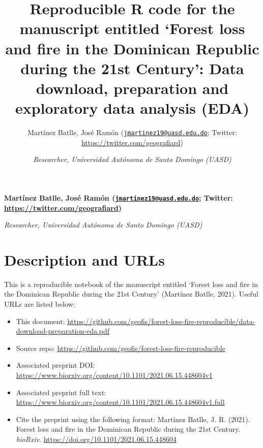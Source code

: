 \documentclass[10pt,landscape,a3paper]{article}
\title{Reproducible R code for the manuscript entitled `Forest loss and
fire in the Dominican Republic during the 21st Century': Data download,
preparation and exploratory data analysis (EDA)  }
\author{\Large Martínez Batlle, José Ramón
(\href{mailto:jmartinez19@uasd.edu.do}{\nolinkurl{jmartinez19@uasd.edu.do}};
Twitter:
\url{https://twitter.com/geografiard})\vspace{0.05in} \newline\normalsize\emph{}   \and \Large \vspace{0.05in} \newline\normalsize\emph{Researcher,
Universidad Autónoma de Santo Domingo (UASD)}  }
\date{}
\newcommand*{\authorfont}{\fontfamily{phv}\selectfont}
\begin{document}
	
%    


{%
\setlength{\parindent}{0pt}
\thispagestyle{plain}
{\fontsize{18}{20}\selectfont\raggedright 
\maketitle  %

}

{
   \vskip 13.5pt\relax \normalsize\fontsize{11}{12} 
\textbf{\authorfont Martínez Batlle, José Ramón
(\href{mailto:jmartinez19@uasd.edu.do}{\nolinkurl{jmartinez19@uasd.edu.do}};
Twitter:
\url{https://twitter.com/geografiard})} \hskip 15pt \emph{\small }   \par \textbf{\authorfont } \hskip 15pt \emph{\small Researcher,
Universidad Autónoma de Santo Domingo (UASD)}   

}

}






\vskip 6.5pt

{
\hypersetup{linkcolor=black}
\setcounter{tocdepth}{4}
\tableofcontents
}

\noindent  \hypertarget{description-and-urls}{%
\section{Description and URLs}\label{description-and-urls}}

This is a reproducible notebook of the manuscript entitled `Forest loss
and fire in the Dominican Republic during the 21st Century' (Martínez
Batlle, 2021). Useful URLs are listed below:

\begin{itemize}
\item
  This document:
  \url{https://github.com/geofis/forest-loss-fire-reproducible/data-download-preparation-eda.pdf}
\item
  Source repo:
  \url{https://github.com/geofis/forest-loss-fire-reproducible}
\item
  Associated preprint DOI:
  \url{https://www.biorxiv.org/content/10.1101/2021.06.15.448604v1}
\item
  Associated preprint full text:
  \url{https://www.biorxiv.org/content/10.1101/2021.06.15.448604v1.full}
\item
  Cite the preprint using the following format: Martínez Batlle, J. R.
  (2021). Forest loss and fire in the Dominican Republic during the 21st
  Century. \emph{bioRxiv}.
  \url{https://doi.org/10.1101/2021.06.15.448604}
\end{itemize}
\end{document}
